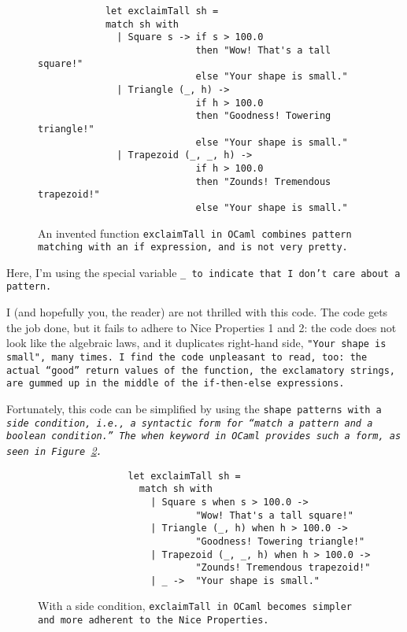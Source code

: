 \documentclass[manuscript,screen,review, 12pt, nonacm]{acmart}
\begin{document}
\begin{outline}[enumerate]
    \begin{figure}[ht]
        \begin{verbatim}
            let exclaimTall sh =
            match sh with 
              | Square s -> if s > 100.0 
                            then "Wow! That's a tall square!"
                            else "Your shape is small." 
              | Triangle (_, h) -> 
                            if h > 100.0 
                            then "Goodness! Towering triangle!"
                            else "Your shape is small." 
              | Trapezoid (_, _, h) -> 
                            if h > 100.0
                            then "Zounds! Tremendous trapezoid!"
                            else "Your shape is small." 
            \end{verbatim}    
        \caption{An invented function \tt{exclaimTall} in OCaml combines pattern
        matching with an \tt{if} expression, and is not very pretty.}   
        \label{fig:ifexclaimtall}
    \end{figure}
    
    Here, I'm using the special variable \tt{\_} to indicate that I don't care
    about a pattern. 

    I (and hopefully you, the reader) are not thrilled with this code. The code
    gets the job done, but it fails to adhere to Nice Properties 1 and 2: the
    code does not look like the algebraic laws, and it duplicates right-hand
    side, \tt{"Your shape is small"}, many times. I find the code unpleasant to
    read, too: the actual “good” return values of the function, the exclamatory
    strings, are gummed up in the middle of the \tt{if-then-else} expressions.
    
    Fortunately, this code can be simplified by using the \tt{shape} patterns
    with a \it{side condition}, i.e., a syntactic form for “match a pattern
    \it{and} a boolean condition.” The \tt{when} keyword in OCaml provides such
    a form, as seen in Figure~\ref{fig:whenexclaimtall}.
        
        \begin{figure}[ht]
            \begin{verbatim}
                let exclaimTall sh =
                  match sh with 
                    | Square s when s > 100.0 ->
                            "Wow! That's a tall square!"
                    | Triangle (_, h) when h > 100.0 ->
                            "Goodness! Towering triangle!"
                    | Trapezoid (_, _, h) when h > 100.0 -> 
                            "Zounds! Tremendous trapezoid!"
                    | _ ->  "Your shape is small." 
                \end{verbatim}
            \caption{With a side condition, \tt{exclaimTall} in OCaml becomes
            simpler and more adherent to the Nice Properties.} 
            \label{fig:whenexclaimtall}
        \end{figure}


\end{outline}
\end{document}
